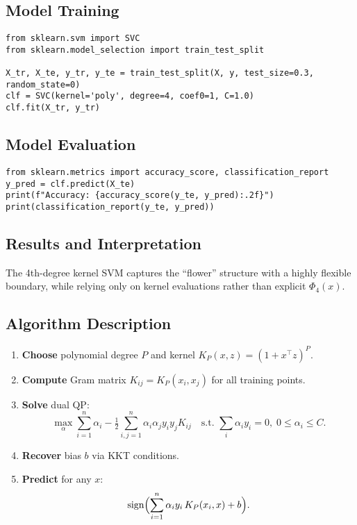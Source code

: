 \documentclass[11pt]{article}
\begin{document}
\subsection{Model Training}
\begin{lstlisting}
from sklearn.svm import SVC
from sklearn.model_selection import train_test_split

X_tr, X_te, y_tr, y_te = train_test_split(X, y, test_size=0.3, random_state=0)
clf = SVC(kernel='poly', degree=4, coef0=1, C=1.0)
clf.fit(X_tr, y_tr)
\end{lstlisting}

\subsection{Model Evaluation}
\begin{lstlisting}
from sklearn.metrics import accuracy_score, classification_report
y_pred = clf.predict(X_te)
print(f"Accuracy: {accuracy_score(y_te, y_pred):.2f}")
print(classification_report(y_te, y_pred))
\end{lstlisting}

\subsection{Results and Interpretation}
The 4th-degree kernel SVM captures the “flower” structure with a highly flexible boundary, while relying only on kernel evaluations rather than explicit $\Phi_4(x)$.

\subsection{Algorithm Description}
\begin{enumerate}
  \item \textbf{Choose} polynomial degree $P$ and kernel $K_P(x,z)=(1 + x^\top z)^P$.
  \item \textbf{Compute} Gram matrix $K_{ij}=K_P(x_i,x_j)$ for all training points.
  \item \textbf{Solve} dual QP:
  \[
    \max_{\alpha}\sum_{i=1}^n \alpha_i
    -\tfrac12\sum_{i,j=1}^n \alpha_i\alpha_j y_i y_j K_{ij}
    \quad\text{s.t. }\sum_i \alpha_i y_i=0,\;0\le\alpha_i\le C.
  \]
  \item \textbf{Recover} bias $b$ via KKT conditions.
  \item \textbf{Predict} for any $x$: 
  \[
    \mathrm{sign}\Bigl(\sum_{i=1}^n \alpha_i y_i\,K_P(x_i,x) + b\Bigr).
  \]
\end{enumerate}
\end{document}
